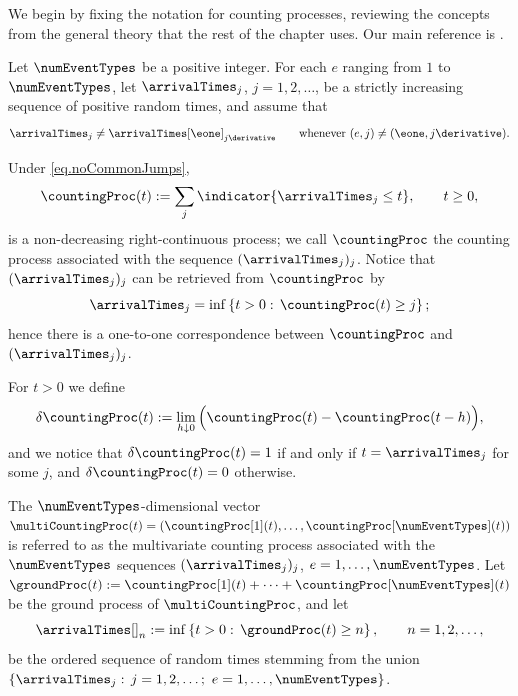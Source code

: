 We begin by fixing the notation for counting processes,
reviewing the concepts from the general theory that the rest of the chapter uses.
Our main reference is \cite[Chapter 14]{DVJ08int}.

Let $\numEventTypes$ be a positive integer.
For each $e$ ranging from $1$ to $\numEventTypes$,
let $\arrivalTimes_{j}$, $j = 1, 2, \dots$, be a strictly increasing sequence of positive random times,
and assume that
\begin{equation}\label{eq.noCommonJumps}
 \arrivalTimes_{j} \neq \arrivalTimes[\eone]_{j\derivative}
 \qquad \text{whenever } (e,j) \neq (\eone, j\derivative).
\end{equation}

Under \eqref{eq.noCommonJumps},
\begin{equation*}
 \countingProc(t) := \sum_{j} \indicator{\arrivalTimes_{j} \leq t},
 \qquad t \geq 0,
\end{equation*}
is a non-decreasing right-continuous process;
we call $\countingProc$ the counting process associated with the sequence $(\arrivalTimes_{j})_j$.
Notice that $(\arrivalTimes_{j})_j$ can be retrieved from $\countingProc$ by
\begin{equation*}
 \arrivalTimes_{j} = \inf \left\lbrace t>0: \, \countingProc(t) \geq j \right\rbrace;
\end{equation*}
hence there is a one-to-one correspondence between $\countingProc$ and $(\arrivalTimes_{j})_j$.

For $t>0$ we define
\begin{equation*}
 \delta\countingProc(t) := \lim_{h\downarrow 0} \Big( \countingProc(t) - \countingProc(t-h) \Big),
\end{equation*}
and we notice that $\delta \countingProc(t) = 1$ if and only if $t = \arrivalTimes_{j}$ for some $j$,
and $\delta \countingProc(t) = 0$ otherwise.

The $\numEventTypes$-dimensional vector
$\multiCountingProc(t) = (\countingProc[1](t), \dots , \countingProc[\numEventTypes](t))$
is referred to as the multivariate counting process associated with the $\numEventTypes$ sequences
$(\arrivalTimes_{j})_j$, $e = 1, \dots, \numEventTypes$.
Let $\groundProc(t) := \countingProc[1](t) + \dots + \countingProc[\numEventTypes](t)$
be the ground process of $\multiCountingProc$,
and let
\begin{equation}
 \label{eq.arrivalTimesOfGroundProcess}
 \arrivalTimes[ ]_{n} := \inf \left\lbrace t>0: \, \groundProc(t) \geq n\right\rbrace,
 \qquad n = 1, 2, \dots,
\end{equation}
be the ordered sequence of random times stemming from the union
$\lbrace \arrivalTimes_{j}: \, j = 1,2,\dots; \,\, e = 1,\dots,\numEventTypes\rbrace$.

